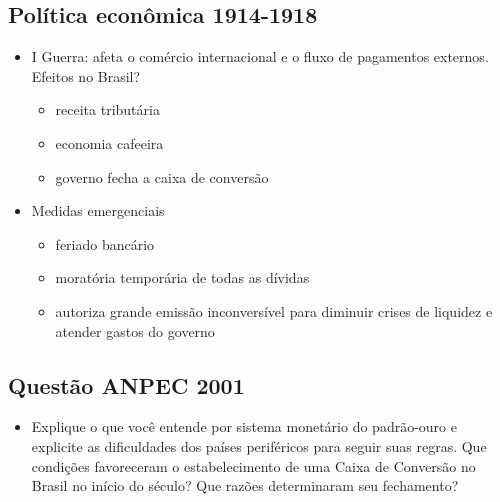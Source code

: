 \documentclass[a4paper,12pt]{article}[abntex2]
\begin{document}
\subsection{\textbf{Política econômica 1914-1918}}
\begin{itemize}
    \item I Guerra: afeta o comércio internacional e o fluxo
de pagamentos externos. Efeitos no Brasil?
\begin{itemize}
    \item receita tributária
\end{itemize}
\begin{itemize}
    \item economia cafeeira
\end{itemize}
\begin{itemize}
    \item  governo fecha a caixa de conversão
\end{itemize}
\item Medidas emergenciais
\begin{itemize}
    \item feriado bancário
\end{itemize}
\begin{itemize}
    \item moratória temporária de todas as dívidas
\end{itemize}
\begin{itemize}
    \item autoriza grande emissão inconversível para diminuir crises de liquidez e atender gastos do governo
\end{itemize}
\end{itemize}
\subsection{\textbf{Questão ANPEC 2001}}
\begin{itemize}
    \item Explique o que você entende por sistema
monetário do padrão-ouro e explicite as dificuldades dos países periféricos para
seguir suas regras. Que condições favoreceram o estabelecimento de uma Caixa de Conversão no Brasil no início do século? Que razões determinaram seu fechamento?
\end{itemize}
\end{document}
